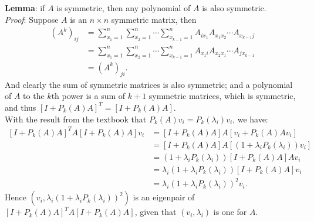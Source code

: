\documentclass[11pt]{article}
\begin{document}
\section{}
\textbf{Lemma}: if $A$ is symmetric, then any polynomial of $A$ is also symmetric.\\[0.4cm]
\textit{Proof}: 
Suppose $A$ is an $n\times n$ symmetric matrix, then
\begin{equation}\begin{split}
(A^k)_{ij} &=\sum_{x_1=1}^n \sum_{x_2=1}^n\cdots\sum_{x_{k-1}=1}^nA_{ix_1}A_{x_1x_2}\cdots A_{x_{k-1}j}\\
&=\sum_{x_1=1}^n \sum_{x_2=1}^n\cdots\sum_{x_{k-1}=1}^nA_{x_1i}A_{x_2x_1}\cdots A_{jx_{k-1}}\\
&=(A^k)_{ji}.
\end{split}\nonumber\end{equation} 
And clearly the sum of symmetric matrices is also symmetric; and a polynomial of $A$ to the $k$th power is a sum of $k+1$ symmetric matrices, which is symmetric, and thus $[I+P_k(A)A]^T = [I + P_k(A)A].$\\[0,4cm]
With the result from the textbook that $P_k(A)v_i=P_k(\lambda_i)v_i$, we have:
\begin{equation}\begin{split} 
[I+P_k(A)A]^TA[I+P_k(A)A]v_i &= [I+P_k(A)A]A[v_i+P_k(A)Av_i]\\
&=[I+P_k(A)A]A[(1+\lambda_iP_k(\lambda_i))v_i] \\
&=(1+\lambda_iP_k(\lambda_i))[I+P_k(A)A]Av_i \\
&=\lambda_i(1+\lambda_iP_k(\lambda_i))[I+P_k(A)A]v_i\\
&=\lambda_i(1+\lambda_iP_k(\lambda_i))^2v_i.
\end{split}\nonumber\end{equation} 
Hence $(v_i,\lambda_i(1+\lambda_iP_k(\lambda_i))^2)$ is an eigenpair of $[I+P_k(A)A]^TA[I+P_k(A)A]$, given that $(v_i,\lambda_i)$ is one for $A$.
\end{document}
